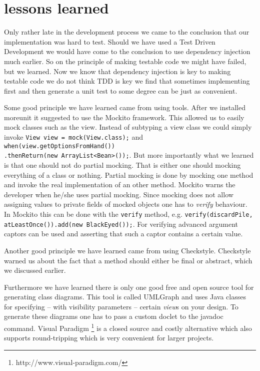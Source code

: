 \section{lessons learned}
Only rather late in the development process we came to the conclusion that our implementation was hard to test. Should we have used a Test
Driven Development we would have come to the conclusion to use dependency injection much earlier. So on the principle of making testable
code we might have failed, but we learned. Now we know that dependency injection is key to making testable code we do not think TDD is key
we find that sometimes implementing first and then generate a unit test to some degree can be just as convenient.

Some good principle we have learned came from using tools. After we installed moreunit it suggested to use the Mockito framework. This
allowed us to easily mock classes such as the view. Instead of subtyping a view class we could simply invoke \texttt{View view =
mock(View.class);} and \texttt{when(view.getOptionsFromHand())} \\ \texttt{.thenReturn(new ArrayList<Bean>());}. But more importantly what
we learned is that one should not do partial mocking. That is either one should mocking everything of a class or nothing. Partial mocking is
done by mocking one method and invoke the real implementation of an other method. Mockito warns the developer when he/she uses partial
mocking. Since mocking does not allow assigning values to private fields of mocked objects one has to \emph{verify} behaviour. In Mockito
this can be done with the \texttt{verify} method, e.g. \texttt{verify(discardPile, atLeastOnce()).add(new BlackEyed());}. For verifying
advanced argument captors can be used and asserting that such a captor contains a certain value.

Another good principle we have learned came from using Checkstyle. Checkstyle warned us about the fact that a method should either be final
or abstract, which we discussed earlier.

Furthermore we have learned there is only one good free and open source tool for generating class diagrams. This tool is called UMLGraph and
uses Java classes for specifying -- with visibility parameters -- certain \emph{view}s on your design. To generate these diagrams one has to
pass a custom doclet to the javadoc command. Visual Paradigm \footnote{http://www.visual-paradigm.com/} is a closed source and costly
alternative which also supports round-tripping which is very convenient for larger projects.
